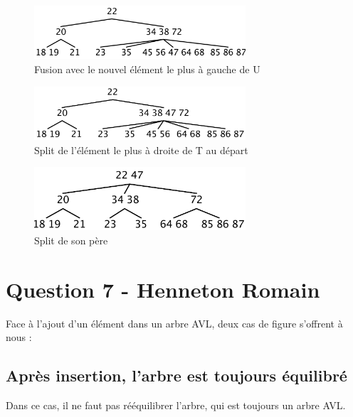 \documentclass[10pt,a4paper]{article}
\begin{document}
\begin{figure}[!h]
	\begin{center}
		\includegraphics[width=0.7\textwidth]{2.png}
		\caption{Fusion avec le nouvel élément le plus à gauche de U}
		\label{2}
	\end{center}
\end{figure}

\begin{figure}[!h]
	\begin{center}
		\includegraphics[width=0.7\textwidth]{3.png}
		\caption{Split de l'élément le plus à droite de T au départ}
		\label{3}
	\end{center}
\end{figure}

\begin{figure}[!h]
	\begin{center}
		\includegraphics[width=0.7\textwidth]{4.png}
		\caption{Split de son père}
		\label{4}
	\end{center}
\end{figure}

\section*{Question 7 - Henneton Romain}
Face à l'ajout d'un élément dans un arbre AVL, deux cas de figure s'offrent à nous :
\subsection*{Après insertion, l'arbre est toujours équilibré}
Dans ce cas, il ne faut pas rééquilibrer l'arbre, qui est toujours un arbre AVL. 
\end{document}
